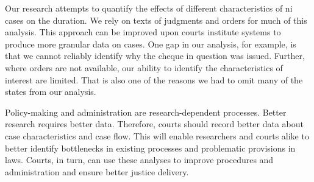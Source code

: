 Our research attempts to quantify the effects of different characteristics of \gls{ni} cases on the duration. We rely on texts of judgments and orders for much of this analysis. This approach can be improved upon courts institute systems to produce more granular data on cases. One gap in our analysis, for example, is that we cannot reliably identify why the cheque in question was issued. Further, where orders are not available, our ability to identify the characteristics of interest are limited. That is also one of the reasons we had to omit many of the states from our analysis.

Policy-making and administration are research-dependent processes. Better research requires better data. Therefore, courts should record better data about case characteristics and case flow. This will enable researchers and courts alike to better identify bottlenecks in existing processes and problematic provisions in laws. Courts, in turn, can use these analyses to improve procedures and administration and ensure better justice delivery.

